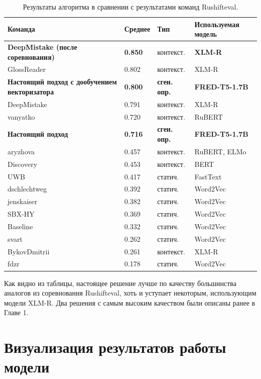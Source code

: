 \documentclass[LI,VKR]{HSEUniversity}
\begin{document}
\begin{table}[H]
\centering
\caption{Результаты алгоритма в сравнении с результатами команд Rushifteval.}
\begin{tabular}{|m{3cm}|m{3cm}|m{3cm}|m{3cm}|}
\hline
\textbf{Команда} & \textbf{Среднее} & \textbf{Тип} & \textbf{Используемая модель} \\
\hline
\textbf{DeepMistake (после соревнования)} & \textbf{0.850} & контекст. & \textbf{XLM-R} \\
\hline
GlossReader & 0.802 & контекст. & XLM-R \\
\hline
\textbf{Настоящий подход с дообучением векторизатора} & \textbf{0.800} & \textbf{сген. опр.} & \textbf{FRED-T5-1.7B} \\
\hline
DeepMistake & 0.791 & контекст. & XLM-R \\
\hline
vanyatko & 0.720 & контекст. & RuBERT \\
\hline
\textbf{Настоящий подход} & \textbf{0.716} & \textbf{сген. опр.} & \textbf{FRED-T5-1.7B} \\
\hline
aryzhova & 0.457 & контекст. & RuBERT, ELMo \\
\hline
Discovery & 0.453 & контекст. & BERT \\
\hline
UWB & 0.417 & статич. & FastText \\
\hline
dschlechtweg & 0.392 & статич. & Word2Vec \\
\hline
jenskaiser & 0.382 & статич. & Word2Vec \\
\hline
SBX-HY & 0.369 & статич. & Word2Vec \\
\hline
Baseline & 0.332 & статич. & Word2Vec \\
\hline
svart & 0.262 & статич. & Word2Vec \\
\hline
BykovDmitrii & 0.261 & контекст. & XLM-R \\
\hline
fdzr & 0.178 & статич. & Word2Vec \\
\hline
\end{tabular}
\end{table}

Как видно из таблицы, настоящее решение лучше по качеству
большинства аналогов из соревнования Rushifteval,
хоть и уступает некоторым, использующим модели XLM-R.
Два решения с самым высоким качеством были описаны ранее в Главе 1.

\section{Визуализация результатов работы модели}
\end{document}
